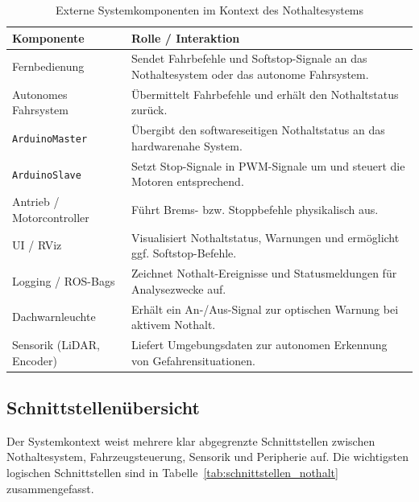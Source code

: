 \begin{table}[h]
  \centering
  \caption{Externe Systemkomponenten im Kontext des Nothaltesystems}
  \label{tab:systemkomponenten_nothalt}
  \begin{tabularx}{\textwidth}{lX}
    \toprule
    \textbf{Komponente} & \textbf{Rolle / Interaktion} \\
    \midrule
    Fernbedienung &
    Sendet Fahrbefehle und Softstop-Signale an das Nothaltesystem oder das autonome Fahrsystem. \\

    Autonomes Fahrsystem &
    Übermittelt Fahrbefehle und erhält den Nothaltstatus zurück. \\

    \texttt{ArduinoMaster} &
    Übergibt den softwareseitigen Nothaltstatus an das hardwarenahe System. \\

    \texttt{ArduinoSlave} &
    Setzt Stop-Signale in PWM-Signale um und steuert die Motoren entsprechend. \\

    Antrieb / Motorcontroller &
    Führt Brems- bzw. Stoppbefehle physikalisch aus. \\

    UI / RViz &
    Visualisiert Nothaltstatus, Warnungen und ermöglicht ggf. Softstop-Befehle. \\

    Logging / ROS-Bags &
    Zeichnet Nothalt-Ereignisse und Statusmeldungen für Analysezwecke auf. \\

    Dachwarnleuchte &
    Erhält ein An-/Aus-Signal zur optischen Warnung bei aktivem Nothalt. \\

    Sensorik (LiDAR, Encoder) &
    Liefert Umgebungsdaten zur autonomen Erkennung von Gefahrensituationen. \\
    \bottomrule
  \end{tabularx}
\end{table}

\subsection{Schnittstellenübersicht}
\label{sec:schnittstellenuebersicht}

Der Systemkontext weist mehrere klar abgegrenzte Schnittstellen zwischen Nothaltesystem, Fahrzeugsteuerung, Sensorik und Peripherie auf. Die wichtigsten logischen Schnittstellen sind in Tabelle~\ref{tab:schnittstellen_nothalt} zusammengefasst.


